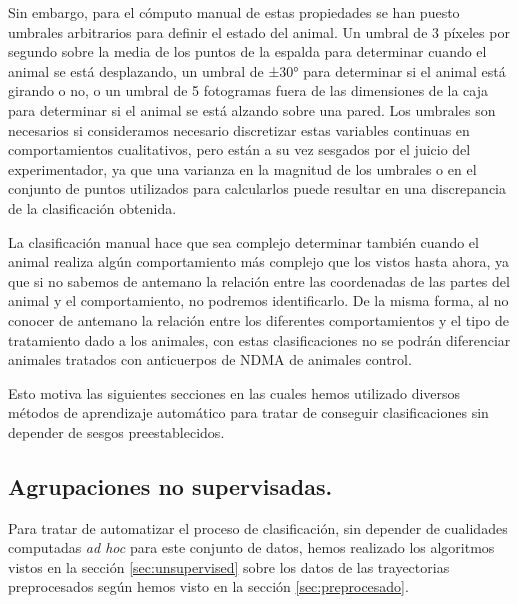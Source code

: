 Sin embargo, para el cómputo manual de estas propiedades se han puesto umbrales arbitrarios para definir el estado del animal. Un umbral de 3 píxeles por segundo sobre la media de los puntos de la espalda para determinar cuando el animal se está desplazando, un umbral de ±30° para determinar si el animal está girando o no, o un umbral de 5 fotogramas fuera de las dimensiones de la caja para determinar si el animal se está alzando sobre una pared. Los umbrales son necesarios si consideramos necesario discretizar estas variables continuas en comportamientos cualitativos, pero están a su vez sesgados por el juicio del experimentador, ya que una varianza en la magnitud de los umbrales o en el conjunto de puntos utilizados para calcularlos puede resultar en una discrepancia de la clasificación obtenida.

La clasificación manual hace que sea complejo determinar también cuando el animal realiza algún comportamiento más complejo que los vistos hasta ahora, ya que si no sabemos de antemano la relación entre las coordenadas de las partes del animal y el comportamiento, no podremos identificarlo. De la misma forma, al no conocer de antemano la relación entre los diferentes comportamientos y el tipo de tratamiento dado a los animales, con estas clasificaciones no se podrán diferenciar animales tratados con anticuerpos de NDMA de animales control.

Esto motiva las siguientes secciones en las cuales hemos utilizado diversos métodos de aprendizaje automático para tratar de conseguir clasificaciones sin depender de sesgos preestablecidos.

\subsection{Agrupaciones no supervisadas.}
Para tratar de automatizar el proceso de clasificación, sin depender de cualidades computadas \textit{ad hoc} para este conjunto de datos, hemos realizado los algoritmos vistos en la sección \ref{sec:unsupervised} sobre los datos de las trayectorias preprocesados según hemos visto en la sección \ref{sec:preprocesado}.

